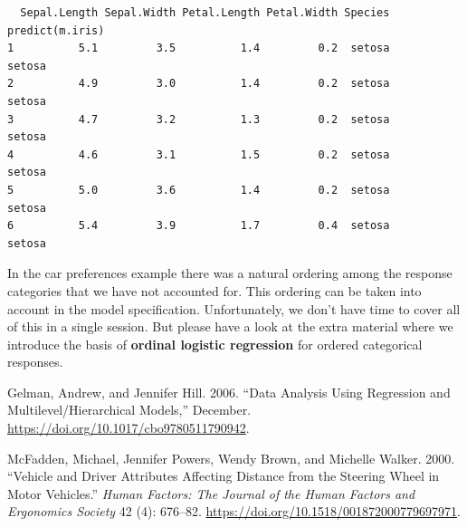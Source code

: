 \documentclass[
  letterpaper,
  DIV=11,
  numbers=noendperiod]{scrartcl}
\newlength{\cslhangindent}
\newenvironment{CSLReferences}[2] %
 {\begin{list}{}{%
  \setlength{\itemindent}{0pt}
  \setlength{\leftmargin}{0pt}
  \setlength{\parsep}{0pt}
  \ifodd #1
   \setlength{\leftmargin}{\cslhangindent}
   \setlength{\itemindent}{-1\cslhangindent}
  \fi
  \setlength{\itemsep}{#2\baselineskip}}}
 {\end{list}}
\begin{document}
\begin{tcolorbox}
\begin{verbatim}
  Sepal.Length Sepal.Width Petal.Length Petal.Width Species predict(m.iris)
1          5.1         3.5          1.4         0.2  setosa          setosa
2          4.9         3.0          1.4         0.2  setosa          setosa
3          4.7         3.2          1.3         0.2  setosa          setosa
4          4.6         3.1          1.5         0.2  setosa          setosa
5          5.0         3.6          1.4         0.2  setosa          setosa
6          5.4         3.9          1.7         0.4  setosa          setosa
\end{verbatim}

\end{tcolorbox}

In the car preferences example there was a natural ordering among the
response categories that we have not accounted for. This ordering can be
taken into account in the model specification. Unfortunately, we don't
have time to cover all of this in a single session. But please have a
look at the extra material where we introduce the basis of
\textbf{ordinal logistic regression} for ordered categorical responses.

\label{refs}
\begin{CSLReferences}{1}{0}
Gelman, Andrew, and Jennifer Hill. 2006. {``Data Analysis Using
Regression and Multilevel/Hierarchical Models,''} December.
\url{https://doi.org/10.1017/cbo9780511790942}.

McFadden, Michael, Jennifer Powers, Wendy Brown, and Michelle Walker.
2000. {``Vehicle and Driver Attributes Affecting Distance from the
Steering Wheel in Motor Vehicles.''} \emph{Human Factors: The Journal of
the Human Factors and Ergonomics Society} 42 (4): 676--82.
\url{https://doi.org/10.1518/001872000779697971}.

\end{CSLReferences}
\end{document}
